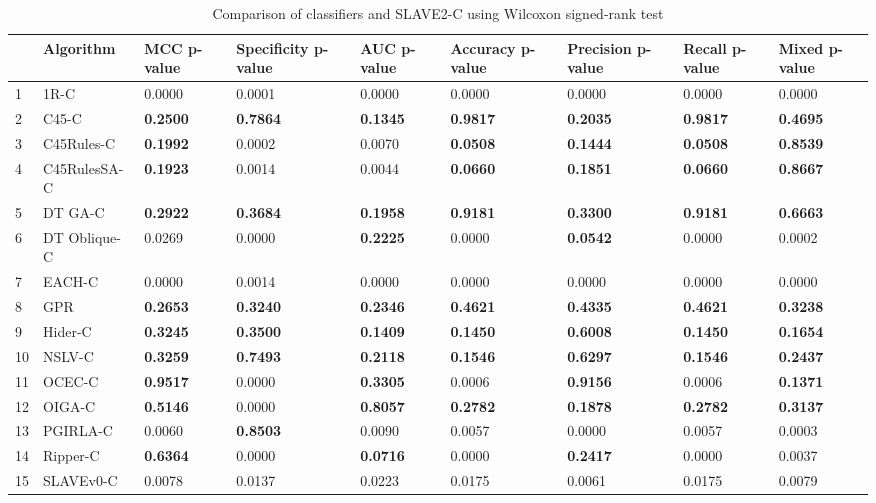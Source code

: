 \begin{table}
\footnotesize
\caption{Comparison of classifiers and SLAVE2-C using Wilcoxon signed-rank test}
\label{tab:wilcoxon comparison}
\begin{tabular}{lllllllll}
\hline
 & Algorithm & MCC p-value & Specificity p-value & AUC p-value & Accuracy p-value & Precision p-value & Recall p-value & Mixed p-value \\
\hline
1 & 1R-C & 0.0000 & 0.0001 & 0.0000 & 0.0000 & 0.0000 & 0.0000 & 0.0000 \\
2 & C45-C & \textbf{0.2500} & \textbf{0.7864} & \textbf{0.1345} & \textbf{0.9817} & \textbf{0.2035} & \textbf{0.9817} & \textbf{0.4695} \\
3 & C45Rules-C & \textbf{0.1992} & 0.0002 & 0.0070 & \textbf{0.0508} & \textbf{0.1444} & \textbf{0.0508} & \textbf{0.8539} \\
4 & C45RulesSA-C & \textbf{0.1923} & 0.0014 & 0.0044 & \textbf{0.0660} & \textbf{0.1851} & \textbf{0.0660} & \textbf{0.8667} \\
5 & DT GA-C & \textbf{0.2922} & \textbf{0.3684} & \textbf{0.1958} & \textbf{0.9181} & \textbf{0.3300} & \textbf{0.9181} & \textbf{0.6663} \\
6 & DT Oblique-C & 0.0269 & 0.0000 & \textbf{0.2225} & 0.0000 & \textbf{0.0542} & 0.0000 & 0.0002 \\
7 & EACH-C & 0.0000 & 0.0014 & 0.0000 & 0.0000 & 0.0000 & 0.0000 & 0.0000 \\
8 & GPR & \textbf{0.2653} & \textbf{0.3240} & \textbf{0.2346} & \textbf{0.4621} & \textbf{0.4335} & \textbf{0.4621} & \textbf{0.3238} \\
9 & Hider-C & \textbf{0.3245} & \textbf{0.3500} & \textbf{0.1409} & \textbf{0.1450} & \textbf{0.6008} & \textbf{0.1450} & \textbf{0.1654} \\
10 & NSLV-C & \textbf{0.3259} & \textbf{0.7493} & \textbf{0.2118} & \textbf{0.1546} & \textbf{0.6297} & \textbf{0.1546} & \textbf{0.2437} \\
11 & OCEC-C & \textbf{0.9517} & 0.0000 & \textbf{0.3305} & 0.0006 & \textbf{0.9156} & 0.0006 & \textbf{0.1371} \\
12 & OIGA-C & \textbf{0.5146} & 0.0000 & \textbf{0.8057} & \textbf{0.2782} & \textbf{0.1878} & \textbf{0.2782} & \textbf{0.3137} \\
13 & PGIRLA-C & 0.0060 & \textbf{0.8503} & 0.0090 & 0.0057 & 0.0000 & 0.0057 & 0.0003 \\
14 & Ripper-C & \textbf{0.6364} & 0.0000 & \textbf{0.0716} & 0.0000 & \textbf{0.2417} & 0.0000 & 0.0037 \\
15 & SLAVEv0-C & 0.0078 & 0.0137 & 0.0223 & 0.0175 & 0.0061 & 0.0175 & 0.0079 \\
\hline
\end{tabular}
\end{table}
